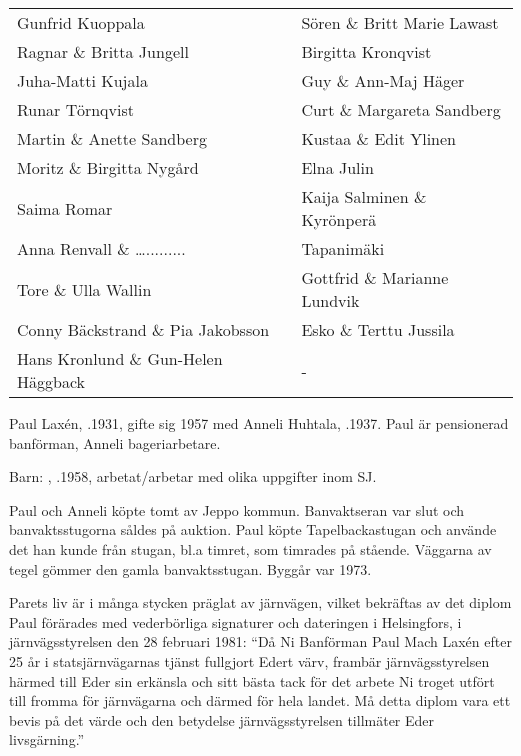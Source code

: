 \begin{center}
\begin{longtable}{l l}
    Gunfrid Kuoppala & Sören \& Britt Marie Lawast \\
    Ragnar \& Britta Jungell & Birgitta Kronqvist \\
    Juha-Matti Kujala & Guy \& Ann-Maj Häger \\
    Runar Törnqvist & Curt \& Margareta Sandberg \\
    Martin \& Anette Sandberg & Kustaa \& Edit Ylinen \\
    Moritz \& Birgitta Nygård & Elna Julin \\
    Saima Romar & Kaija Salminen \& Kyrönperä \\
    Anna Renvall \& …......... & Tapanimäki \\
    Tore \& Ulla Wallin & Gottfrid \& Marianne Lundvik \\
    Conny Bäckstrand \& Pia Jakobsson & Esko \& Terttu Jussila \\
    Hans Kronlund \& Gun-Helen Häggback & - \\
    \hline
  \end{longtable}
\end{center}



%



%
Paul Laxén, .1931, gifte sig 1957 med Anneli Huhtala, .1937. Paul är pensionerad banförman, Anneli bageriarbetare.

Barn: , .1958, arbetat/arbetar med olika uppgifter inom SJ.

Paul och Anneli köpte tomt av Jeppo kommun. Banvaktseran var slut och banvaktsstugorna såldes på auktion. Paul köpte Tapelbackastugan och använde det han kunde från stugan, bl.a timret, som timrades på stående. Väggarna av tegel gömmer den gamla banvaktsstugan. Byggår var 1973.

Parets liv är i många stycken präglat av järnvägen, vilket bekräftas av det diplom Paul förärades med vederbörliga signaturer och dateringen i Helsingfors, i järnvägsstyrelsen den 28 februari 1981: ``Då Ni Banförman Paul Mach Laxén efter 25 år i statsjärnvägarnas tjänst fullgjort Edert värv, frambär järnvägsstyrelsen härmed till Eder sin erkänsla och sitt bästa tack för det arbete Ni troget utfört till fromma för järnvägarna och därmed för hela landet. Må detta diplom vara ett bevis på det värde och den betydelse järnvägsstyrelsen tillmäter Eder livsgärning.''

